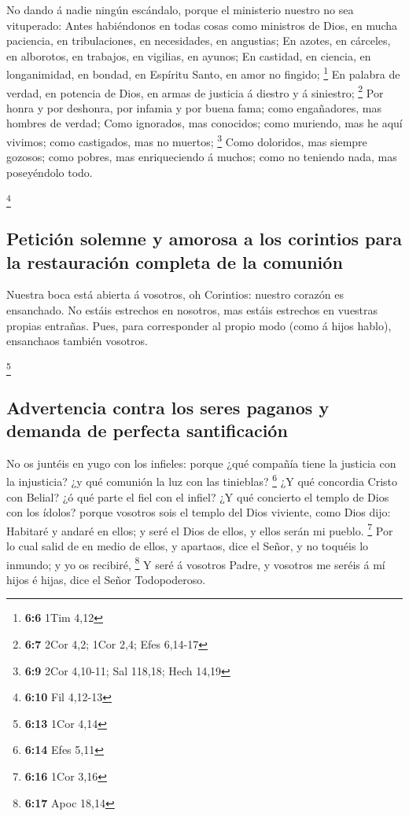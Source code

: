  No dando á nadie ningún escándalo, porque el ministerio
nuestro no sea vituperado:  Antes habiéndonos en todas cosas
como ministros de Dios, en mucha paciencia, en tribulaciones, en
necesidades, en angustias;  En azotes, en cárceles, en
alborotos, en trabajos, en vigilias, en ayunos;  En
castidad, en ciencia, en longanimidad, en bondad, en Espíritu Santo, en
amor no fingido; \footnote{\textbf{6:6} 1Tim 4,12}  En
palabra de verdad, en potencia de Dios, en armas de justicia á diestro y
á siniestro; \footnote{\textbf{6:7} 2Cor 4,2; 1Cor 2,4; Efes 6,14-17}
 Por honra y por deshonra, por infamia y por buena fama;
como engañadores, mas hombres de verdad;  Como ignorados,
mas conocidos; como muriendo, mas he aquí vivimos; como castigados, mas
no muertos; \footnote{\textbf{6:9} 2Cor 4,10-11; Sal 118,18; Hech 14,19}
 Como doloridos, mas siempre gozosos; como pobres, mas
enriqueciendo á muchos; como no teniendo nada, mas poseyéndolo todo.

\footnote{\textbf{6:10} Fil 4,12-13}

\hypertarget{peticiuxf3n-solemne-y-amorosa-a-los-corintios-para-la-restauraciuxf3n-completa-de-la-comuniuxf3n}{%
\subsection{Petición solemne y amorosa a los corintios para la
restauración completa de la
comunión}\label{peticiuxf3n-solemne-y-amorosa-a-los-corintios-para-la-restauraciuxf3n-completa-de-la-comuniuxf3n}}

 Nuestra boca está abierta á vosotros, oh Corintios:
nuestro corazón es ensanchado.  No estáis estrechos en
nosotros, mas estáis estrechos en vuestras propias entrañas.
 Pues, para corresponder al propio modo (como á hijos
hablo), ensanchaos también vosotros.

\footnote{\textbf{6:13} 1Cor 4,14}

\hypertarget{advertencia-contra-los-seres-paganos-y-demanda-de-perfecta-santificaciuxf3n}{%
\subsection{Advertencia contra los seres paganos y demanda de perfecta
santificación}\label{advertencia-contra-los-seres-paganos-y-demanda-de-perfecta-santificaciuxf3n}}

 No os juntéis en yugo con los infieles: porque ¿qué
compañía tiene la justicia con la injusticia? ¿y qué comunión la luz con
las tinieblas? \footnote{\textbf{6:14} Efes 5,11}  ¿Y qué
concordia Cristo con Belial? ¿ó qué parte el fiel con el infiel?
 ¿Y qué concierto el templo de Dios con los ídolos? porque
vosotros sois el templo del Dios viviente, como Dios dijo: Habitaré y
andaré en ellos; y seré el Dios de ellos, y ellos serán mi pueblo.
\footnote{\textbf{6:16} 1Cor 3,16}  Por lo cual salid de en
medio de ellos, y apartaos, dice el Señor, y no toquéis lo inmundo; y yo
os recibiré, \footnote{\textbf{6:17} Apoc 18,14}  Y seré á
vosotros Padre, y vosotros me seréis á mí hijos é hijas, dice el Señor
Todopoderoso.

